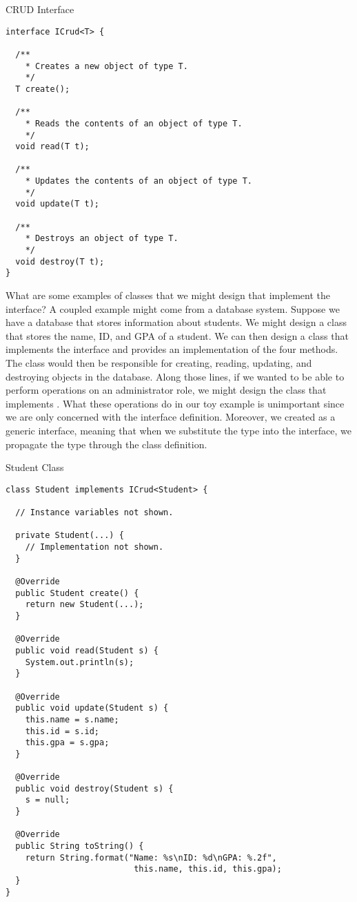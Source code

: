 \begin{cl}{CRUD Interface}
\begin{lstlisting}[language=MyJava]
interface ICrud<T> {

  /**
    * Creates a new object of type T.
    */
  T create();

  /**
    * Reads the contents of an object of type T.
    */
  void read(T t);

  /**
    * Updates the contents of an object of type T.
    */
  void update(T t);

  /**
    * Destroys an object of type T.
    */
  void destroy(T t);
}
\end{lstlisting}
\end{cl}
What are some examples of classes that we might design that implement the  interface? A coupled example might come from a database system. Suppose we have a database that stores information about students. We might design a  class that stores the name, ID, and GPA of a student. We can then design a  class that implements the  interface and provides an implementation of the four methods. The  class would then be responsible for creating, reading, updating, and destroying  objects in the database. Along those lines, if we wanted to be able to perform operations on an administrator role, we might design the  class that implements . What these operations do in our toy example is unimportant since we are only concerned with the interface definition. Moreover, we created  as a generic interface, meaning that when we substitute the type into the interface, we propagate the type through the class definition.

\begin{cl}{Student Class}
\begin{lstlisting}[language=MyJava]
class Student implements ICrud<Student> {
  
  // Instance variables not shown.
  
  private Student(...) {
    // Implementation not shown.
  }
  
  @Override
  public Student create() {
    return new Student(...);
  }
  
  @Override
  public void read(Student s) {
    System.out.println(s);
  }
  
  @Override
  public void update(Student s) {
    this.name = s.name;
    this.id = s.id;
    this.gpa = s.gpa;
  }
  
  @Override
  public void destroy(Student s) {
    s = null;
  }
  
  @Override
  public String toString() {
    return String.format("Name: %s\nID: %d\nGPA: %.2f", 
                          this.name, this.id, this.gpa);
  }
}
\end{lstlisting}
\end{cl}

